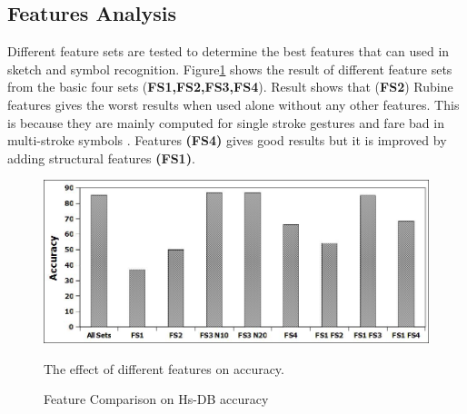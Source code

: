 \documentclass{article}
\begin{document}
\begin{table}
	\centering
 
	\caption{Confusion Matrix of Hs-DB}
	\label{tab:ConfusionMatrix}
\end{table}
%  
\subsection{Features Analysis}
\label{sec:featexp}
Different feature sets are tested to determine the best features that can used in sketch and symbol recognition. Figure\ref{fig:testFeaturesAll} shows the result of different feature sets from the basic four sets (\textbf{FS1,FS2,FS3,FS4}). Result shows that (\textbf{FS2}) Rubine features \cite{gestureexample12} gives the worst results when used alone without any other features. This is because they are mainly computed for single stroke gestures and fare bad in multi-stroke symbols \cite{compareFeaturSVM}. Features \textbf{(FS4)} gives good results but it is improved by adding structural features \textbf{(FS1)}.
 \begin{figure}
	\centering
		\includegraphics[scale=0.5]{images/featuresdifference.jpg}
	\caption{Feature Comparison on Hs-DB accuracy} The effect of different features on accuracy.  %
	\label{fig:testFeaturesAll}
\end{figure}  
\end{document}
